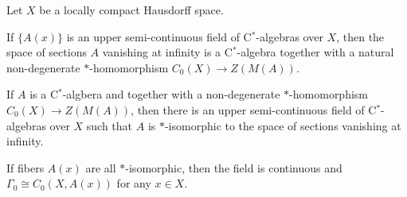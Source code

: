 \documentclass{../../large}
\begin{document}
\begin{prb}
Let $X$ be a locally compact Hausdorff space.

\begin{parts}
\item If $\{A(x)\}$ is an upper semi-continuous field of C$^*$-algebras over $X$, then the space of sections $A$ vanishing at infinity is a C$^*$-algebra together with a natural non-degenerate $*$-homomorphism $C_0(X)\to Z(M(A))$.
\item If $A$ is a C$^*$-algbera and together with a non-degenerate $*$-homomorphism $C_0(X)\to Z(M(A))$, then there is an upper semi-continuous field of C$^*$-algebras over $X$ such that $A$ is $*$-isomorphic to the space of sections vanishing at infinity.
\item If fibers $A(x)$ are all $*$-isomorphic, then the field is continuous and $\Gamma_0\cong C_0(X,A(x))$ for any $x\in X$.
\end{parts}
\end{prb}
\end{document}
